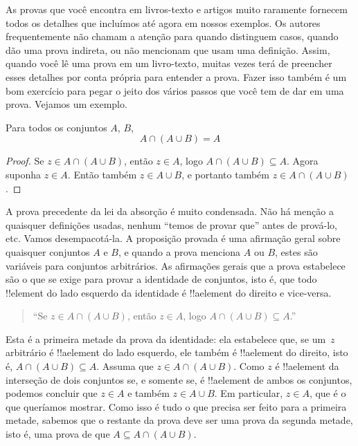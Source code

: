 \documentclass[../../../include/open-logic-section]{subfiles}
\begin{document}

As provas que você encontra em livros-texto e artigos muito raramente
fornecem todos os detalhes que incluímos até agora em nossos exemplos.
Os autores frequentemente não chamam a atenção para quando distinguem
casos, quando dão uma prova indireta, ou não mencionam que usam uma
definição.  Assim, quando você lê uma prova em um livro-texto, muitas
vezes terá de preencher esses detalhes por conta própria para entender
a prova. Fazer isso também é um bom exercício para pegar o jeito dos
vários passos que você tem de dar em uma prova. Vejamos um exemplo.

\begin{prop}[Absorção]
Para todos os conjuntos $A$, $B$,
\[
A \cap (A \cup B) = A
\]
\end{prop}

\begin{proof}
Se $z \in A \cap (A \cup B)$, então $z \in A$, logo $A \cap (A \cup B)
\subseteq A$. Agora suponha $z \in A$. Então também $z \in A \cup B$, e
portanto também $z \in A \cap (A \cup B)$.
\end{proof}

A prova precedente da lei da absorção é muito condensada. Não há
menção a quaisquer definições usadas, nenhum ``temos de provar que''
antes de prová-lo, etc. Vamos desempacotá-la.  A proposição provada é
uma afirmação geral sobre quaisquer conjuntos $A$ e $B$, e quando a
prova menciona $A$ ou $B$, estes são variáveis para conjuntos
arbitrários.  As afirmações gerais que a prova estabelece são o que se
exige para provar a identidade de conjuntos, isto é, que todo
!!{element} do lado esquerdo da identidade é !!a{element} do direito e
vice-versa.

\begin{quote}
``Se $z \in A \cap (A \cup B)$, então $z \in A$, logo $A \cap (A \cup B)
  \subseteq A$.''
\end{quote}

Esta é a primeira metade da prova da identidade: ela estabelece
que, se um~$z$ arbitrário é !!a{element} do lado esquerdo, ele também é
!!a{element} do direito, isto é, $A \cap (A \cup B) \subseteq A$.
Assuma que $z \in A \cap (A \cup B)$. Como $z$ é !!a{element} da
interseção de dois conjuntos se, e somente se, é !!a{element} de ambos
os conjuntos, podemos concluir que $z \in A$ e também $z \in A \cup B$.
Em particular, $z \in A$, que é o que queríamos mostrar.  Como isso é
tudo o que precisa ser feito para a primeira metade, sabemos que o
restante da prova deve ser uma prova da segunda metade, isto é, uma
prova de que $A \subseteq A \cap (A \cup B)$.
\end{document}

